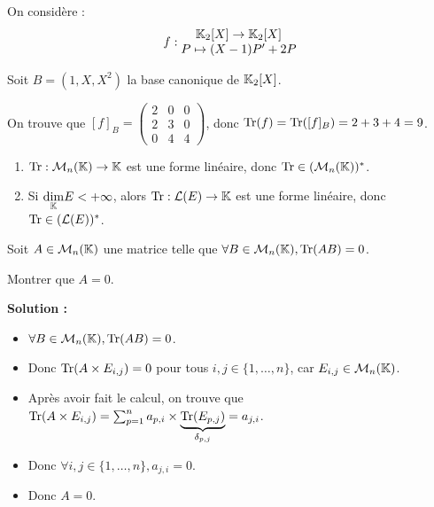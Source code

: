 \documentclass[12pt, a4paper]{report}
\begin{document}
\begin{example}
    On considère :
    $$f : \begin{matrix} \mathbb{K}_2[X] \to \mathbb{K}_2[X] \\ P \mapsto (X-1)P' + 2P \end{matrix}$$

    Soit $B = (1,X,X^2)$ la base canonique de $\mathbb{K}_2[X]$.
    
    On trouve que $[f]_B = \left(\begin{matrix}
        2 & 0 & 0 \\
        2 & 3 & 0 \\
        0 & 4 & 4
    \end{matrix}\right)$, donc $\mathrm{Tr}(f) = \mathrm{Tr}([f]_B) = 2 + 3 + 4 = 9$.
\end{example}

\begin{property}
    \begin{enumerate}
        \item $\mathrm{Tr} : \mathcal M_n(\mathbb{K}) \to \mathbb{K}$ est une forme linéaire, donc $\mathrm{Tr} \in (\mathcal M_n(\mathbb{K}))^*$.
        \item Si $\underset{\mathbb{K}}\dim E < +\infty$, alors $\mathrm{Tr} : \mathcal L(E) \to \mathbb{K}$ est une forme linéaire, donc $\mathrm{Tr} \in (\mathcal L(E))^*$.
    \end{enumerate}
\end{property}

\begin{exercise}
    Soit $A \in \mathcal M_n(\mathbb{K})$ une matrice telle que $\forall B \in \mathcal M_n(\mathbb{K}), \mathrm{Tr}(AB) = 0$.

    Montrer que $A = 0$.

    \textbf{Solution :}

    \begin{itemize}
        \item $\forall B \in \mathcal M_n(\mathbb{K}), \mathrm{Tr}(AB) = 0$.
        \item Donc $\mathrm{Tr}(A \times E_{i,j}) = 0$ pour tous $i,j \in \{1,\dots,n\}$, car $E_{i,j} \in \mathcal M_n(\mathbb{K})$.
        \item Après avoir fait le calcul, on trouve que $\mathrm{Tr}(A \times E_{i,j}) = \sum_{p=1}^n a_{p,i} \times \underbrace{\mathrm{Tr}(E_{p,j})}_{\delta_{p,j}} =a_{j,i}$.
        \item Donc $\forall i,j \in \{1,\dots,n\}, a_{j,i} = 0$.
        \item Donc $A = 0$.
    \end{itemize}
\end{exercise}
\end{document}
